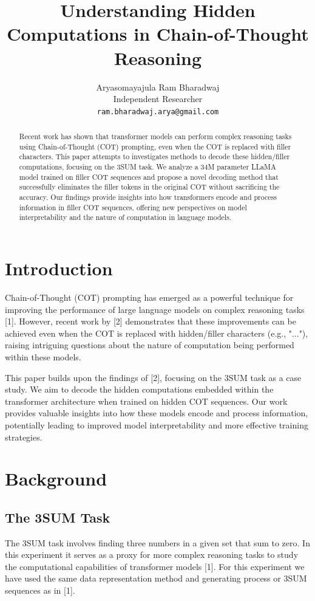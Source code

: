 \documentclass[10pt,a4paper]{article}
\title{Understanding Hidden Computations in Chain-of-Thought Reasoning}
\author{Aryasomayajula Ram Bharadwaj\\
Independent Researcher\\
\texttt{ram.bharadwaj.arya@gmail.com}}
\begin{document}
\maketitle

\begin{abstract}
Recent work has shown that transformer models can perform complex reasoning tasks using Chain-of-Thought (COT) prompting, even when the COT is replaced with filler characters. This paper attempts to investigates methods to decode these hidden/filler computations, focusing on the 3SUM task. We analyze a 34M parameter LLaMA model trained on filler COT sequences and propose a novel decoding method that successfully eliminates the filler tokens in the original COT without sacrificing the accuracy. Our findings provide insights into how transformers encode and process information in filler COT sequences, offering new perspectives on model interpretability and the nature of computation in language models.

\end{abstract}

\section{Introduction}
Chain-of-Thought (COT) prompting has emerged as a powerful technique for improving the performance of large language models on complex reasoning tasks [1]. However, recent work by [2] demonstrates that these improvements can be achieved even when the COT is replaced with hidden/filler characters (e.g., "..."), raising intriguing questions about the nature of computation being performed within these models.

This paper builds upon the findings of [2], focusing on the 3SUM task as a case study. We aim to decode the hidden computations embedded within the transformer architecture when trained on hidden COT sequences. Our work provides valuable insights into how these models encode and process information, potentially leading to improved model interpretability and more effective training strategies.

\section{Background}

\subsection{The 3SUM Task}
The 3SUM task involves finding three numbers in a given set that sum to zero. In this experiment it serves as a proxy for more complex reasoning tasks to study the computational capabilities of transformer models [1]. For this experiment we have used the same data representation method and generating process or 3SUM sequences as in [1].
\end{document}
